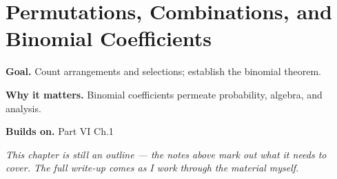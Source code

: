 \chapter{Permutations, Combinations, and Binomial Coefficients}
\label{ch:06-combinatorics-and-graph-theory-02}

\begin{chapterintro}
\textbf{Goal.} Count arrangements and selections; establish the binomial theorem.

\textbf{Why it matters.} Binomial coefficients permeate probability, algebra, and analysis.

\textbf{Builds on.} Part VI Ch.1
\end{chapterintro}

\textit{This chapter is still an outline --- the notes above mark out what it needs to cover. The full write-up comes as I work through the material myself.}
